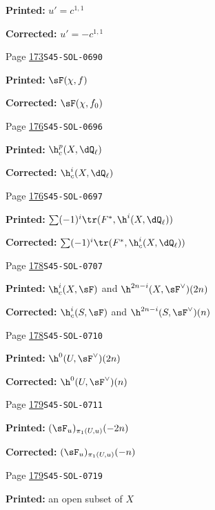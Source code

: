 \begin{description}
\par\noindent\textbf{Printed:} \(u'=c^{1,1}\)
\par\noindent\textbf{Corrected:} \(u'=-c^{1,1}\)
\smallskip
\item[\hypertarget{apparatus:EN-0099}{99}] Page \hyperlink{printpage:en:173}{173}\quad\texttt{S45-SOL-0690}
\par\noindent\textbf{Printed:} \(\sF(\chi,f)\)
\par\noindent\textbf{Corrected:} \(\sF(\chi,f_0)\)
\smallskip
\item[\hypertarget{apparatus:EN-0100}{100}] Page \hyperlink{printpage:en:176}{176}\quad\texttt{S45-SOL-0696}
\par\noindent\textbf{Printed:} \(\h_c^p(X,\dQ_\ell)\)
\par\noindent\textbf{Corrected:} \(\h_c^i(X,\dQ_\ell)\)
\smallskip
\item[\hypertarget{apparatus:EN-0101}{101}] Page \hyperlink{printpage:en:176}{176}\quad\texttt{S45-SOL-0697}
\par\noindent\textbf{Printed:} \(\sum (-1)^i \tr(F^\ast,\h^i(X,\dQ_\ell))\)
\par\noindent\textbf{Corrected:} \(\sum (-1)^i \tr(F^\ast,\h_c^i(X,\dQ_\ell))\)
\smallskip
\item[\hypertarget{apparatus:EN-0102}{102}] Page \hyperlink{printpage:en:178}{178}\quad\texttt{S45-SOL-0707}
\par\noindent\textbf{Printed:} $\h_c^i(X,\sF)$ and $\h^{2n-i}(X,\sF^\vee)(2n)$
\par\noindent\textbf{Corrected:} $\h_c^i(S,\sF)$ and $\h^{2n-i}(S,\sF^\vee)(n)$
\smallskip
\item[\hypertarget{apparatus:EN-0103}{103}] Page \hyperlink{printpage:en:178}{178}\quad\texttt{S45-SOL-0710}
\par\noindent\textbf{Printed:} \(\h^0(U,\sF^\vee)(2n)\)
\par\noindent\textbf{Corrected:} \(\h^0(U,\sF^\vee)(n)\)
\smallskip
\item[\hypertarget{apparatus:EN-0104}{104}] Page \hyperlink{printpage:en:179}{179}\quad\texttt{S45-SOL-0711}
\par\noindent\textbf{Printed:} \((\sF_u)_{\pi_1(U,u)}(-2n)\)
\par\noindent\textbf{Corrected:} \((\sF_u)_{\pi_1(U,u)}(-n)\)
\smallskip
\item[\hypertarget{apparatus:EN-0105}{105}] Page \hyperlink{printpage:en:179}{179}\quad\texttt{S45-SOL-0719}
\par\noindent\textbf{Printed:} an open subset of $X$

\end{description}
